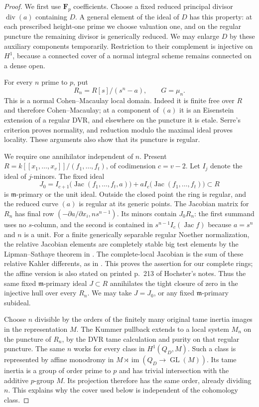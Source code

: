 \begin{proof}
We first use $\mathbf F_p$ coefficients. Choose a fixed reduced principal
divisor $\operatorname{div}(a)$ containing $D$. A general element of
the ideal of $D$ has this property: at each prescribed height-one prime
we choose valuation one, and on the regular puncture the remaining
divisor is generically reduced. We may enlarge $D$ by these auxiliary
components temporarily. Restriction to their complement is injective
on $H^1$, because a connected cover of a normal integral scheme remains
connected on a dense open.

For every $n$ prime to $p$, put
\[
 R_n=R[s]/(s^n-a),\qquad G=\mu_n.
\]
This is a normal Cohen--Macaulay local domain. Indeed it is finite free
over $R$ and therefore Cohen--Macaulay; at a component of $(a)$ it is
an Eisenstein extension of a regular DVR, and elsewhere on the puncture
it is etale. Serre's criterion proves normality, and reduction modulo
the maximal ideal proves locality. These arguments also show that its
puncture is regular.

We require one annihilator independent of $n$. Present
$R=k[[x_1,\ldots,x_v]]/(f_1,\ldots,f_t)$, of codimension $c=v-2$.
Let $I_j$ denote the ideal of $j$-minors. The fixed ideal
\[
 J_0=I_{c+1}\bigl(\operatorname{Jac}(f_1,\ldots,f_t,a)\bigr)
       +aI_c\bigl(\operatorname{Jac}(f_1,\ldots,f_t)\bigr)
       \subset R
\]
is $\mathfrak m$-primary or the unit ideal. Outside the closed point
the ring is regular, and the reduced curve $(a)$ is regular at its
generic points. The Jacobian matrix for $R_n$ has final row
$(-\partial a/\partial x_i,ns^{n-1})$. Its minors contain $J_0R_n$:
the first summand uses no $s$-column, and the second is contained in
$s^{n-1}I_c(\operatorname{Jac}f)$ because $a=s^n$ and $n$ is a unit.
For a finite generically separable regular Noether normalization, the
relative Jacobian elements are completely stable big test elements by
the Lipman--Sathaye theorem in
\citet[printed p.~207]{C_Hochster2007}. The complete-local Jacobian is
the sum of these relative Kahler differents, as in
\citet[Section 3(3.1), Examples 3.2--3.3]{C_IyengarTakahashiStable}.
This proves the assertion for our complete rings; the affine version
is also stated on printed p.~213 of Hochster's notes. Thus the same
fixed $\mathfrak m$-primary ideal $J\subset R$ annihilates the tight
closure of zero in the injective hull over every $R_n$. We may take
$J=J_0$, or any fixed $\mathfrak m$-primary subideal.

Choose $n$ divisible by the orders of the finitely many original tame
inertia images in the representation $M$. The Kummer pullback extends
to a local system $M_n$ on the puncture of $R_n$, by the DVR tame
calculation and purity on that regular puncture. The same $n$ works for
every class in $H^1(Q_D,M)$. Such a class is represented by affine
monodromy in $M\rtimes\operatorname{im}(Q_D\to\operatorname{GL}(M))$.
Its tame inertia is a group of order prime to $p$ and has trivial
intersection with the additive $p$-group $M$. Its projection therefore
has the same order, already dividing $n$. This explains why the cover
used below is independent of the cohomology class.


\end{proof}
